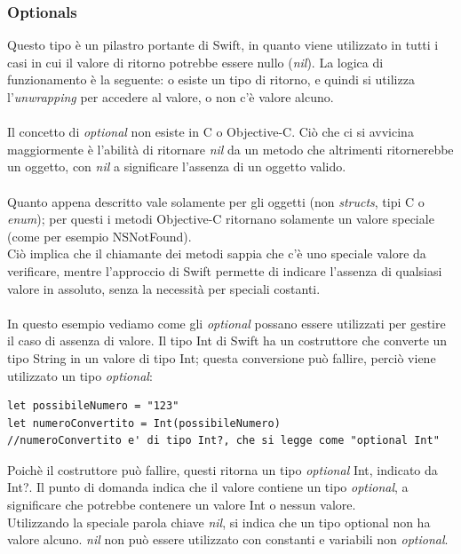 \subsubsection{Optionals}
Questo tipo è un pilastro portante di Swift, in quanto viene utilizzato in tutti i casi in cui il valore di ritorno potrebbe essere nullo (\textit{nil}). La logica di funzionamento è la seguente: o esiste un tipo di ritorno, e quindi si utilizza l'\textit{unwrapping} per accedere al valore, o non c'è valore alcuno.\\\\
Il concetto di \textit{optional} non esiste in C o Objective-C. Ciò che ci si avvicina maggiormente è l'abilità di ritornare \textit{nil} da un metodo che altrimenti ritornerebbe un oggetto, con \textit{nil} a significare l'assenza di un oggetto valido.\\\\Quanto appena descritto vale solamente per gli oggetti (non \textit{structs}, tipi C  o \textit{enum}); per questi i metodi Objective-C ritornano solamente un valore speciale (come per esempio NSNotFound).\\Ciò implica che il chiamante dei metodi sappia che c'è uno speciale valore da verificare, mentre l'approccio di Swift permette di indicare l'assenza di qualsiasi valore in assoluto, senza la necessità per speciali costanti.\\\\
In questo esempio vediamo come gli \textit{optional} possano essere utilizzati per gestire il caso di assenza di valore. Il tipo Int di Swift ha un costruttore che converte un tipo String in un valore di tipo Int; questa conversione può fallire, perciò viene utilizzato un tipo \textit{optional}:
\lstset{language=[Objective]C, breakindent=40pt, breaklines}
\begin{lstlisting}
let possibileNumero = "123"
let numeroConvertito = Int(possibileNumero)
//numeroConvertito e' di tipo Int?, che si legge come "optional Int"
\end{lstlisting} 
Poichè il costruttore può fallire, questi ritorna un tipo \textit{optional} Int, indicato da Int?. Il punto di domanda indica che il valore contiene un tipo \textit{optional}, a significare che potrebbe contenere un valore Int o nessun valore.\\
Utilizzando la speciale parola chiave \textit{nil}, si indica che un tipo optional non ha valore alcuno. \textit{nil} non può essere utilizzato con constanti e variabili non \textit{optional}.
\lstset{language=[Objective]C, breakindent=40pt, breaklines}

